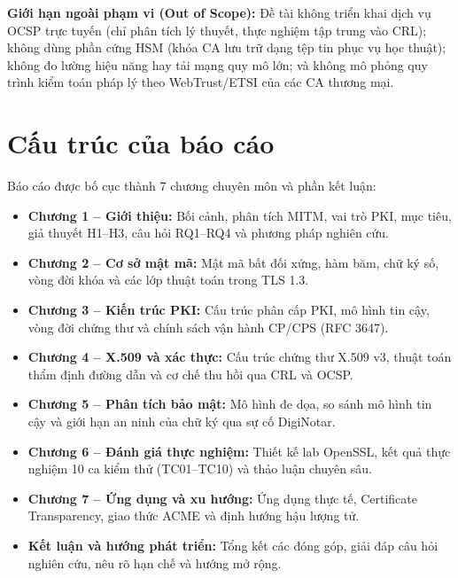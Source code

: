 \noindent\textbf{Giới hạn ngoài phạm vi (Out of Scope):} Đề tài không triển khai dịch vụ OCSP trực tuyến (chỉ phân tích lý thuyết, thực nghiệm tập trung vào CRL); không dùng phần cứng HSM (khóa CA lưu trữ dạng tệp tin phục vụ học thuật); không đo lường hiệu năng hay tải mạng quy mô lớn; và không mô phỏng quy trình kiểm toán pháp lý theo WebTrust/ETSI của các CA thương mại.

\section{Cấu trúc của báo cáo}
\label{sec:report-structure}
Báo cáo được bố cục thành 7 chương chuyên môn và phần kết luận:
\begin{itemize}
    \item \textbf{Chương 1 -- Giới thiệu:} Bối cảnh, phân tích MITM, vai trò PKI, mục tiêu, giả thuyết H1--H3, câu hỏi RQ1--RQ4 và phương pháp nghiên cứu.
    \item \textbf{Chương 2 -- Cơ sở mật mã:} Mật mã bất đối xứng, hàm băm, chữ ký số, vòng đời khóa và các lớp thuật toán trong TLS 1.3.
    \item \textbf{Chương 3 -- Kiến trúc PKI:} Cấu trúc phân cấp PKI, mô hình tin cậy, vòng đời chứng thư và chính sách vận hành CP/CPS (RFC 3647).
    \item \textbf{Chương 4 -- X.509 và xác thực:} Cấu trúc chứng thư X.509 v3, thuật toán thẩm định đường dẫn và cơ chế thu hồi qua CRL và OCSP.
    \item \textbf{Chương 5 -- Phân tích bảo mật:} Mô hình đe dọa, so sánh mô hình tin cậy và giới hạn an ninh của chữ ký qua sự cố DigiNotar.
    \item \textbf{Chương 6 -- Đánh giá thực nghiệm:} Thiết kế lab OpenSSL, kết quả thực nghiệm 10 ca kiểm thử (TC01--TC10) và thảo luận chuyên sâu.
    \item \textbf{Chương 7 -- Ứng dụng và xu hướng:} Ứng dụng thực tế, Certificate Transparency, giao thức ACME và định hướng hậu lượng tử.
    \item \textbf{Kết luận và hướng phát triển:} Tổng kết các đóng góp, giải đáp câu hỏi nghiên cứu, nêu rõ hạn chế và hướng mở rộng.
\end{itemize}
